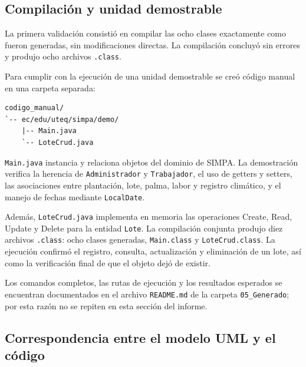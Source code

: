 \subsection{Compilación y unidad demostrable}

La primera validación consistió en compilar las ocho clases exactamente como fueron generadas, sin modificaciones directas. La compilación concluyó sin errores y produjo ocho archivos \texttt{.class}.

Para cumplir con la ejecución de una unidad demostrable se creó código manual en una carpeta separada:

\begin{verbatim}
codigo_manual/
`-- ec/edu/uteq/simpa/demo/
    |-- Main.java
    `-- LoteCrud.java
\end{verbatim}

\texttt{Main.java} instancia y relaciona objetos del dominio de SIMPA. La demostración verifica la herencia de \texttt{Administrador} y \texttt{Trabajador}, el uso de getters y setters, las asociaciones entre plantación, lote, palma, labor y registro climático, y el manejo de fechas mediante \texttt{LocalDate}.

Además, \texttt{LoteCrud.java} implementa en memoria las operaciones Create, Read, Update y Delete para la entidad \texttt{Lote}. La compilación conjunta produjo diez archivos \texttt{.class}: ocho clases generadas, \texttt{Main.class} y \texttt{LoteCrud.class}. La ejecución confirmó el registro, consulta, actualización y eliminación de un lote, así como la verificación final de que el objeto dejó de existir.

Los comandos completos, las rutas de ejecución y los resultados esperados se encuentran documentados en el archivo \texttt{README.md} de la carpeta \texttt{05\_Generado}; por esta razón no se repiten en esta sección del informe.

\subsection{Correspondencia entre el modelo UML y el código}


